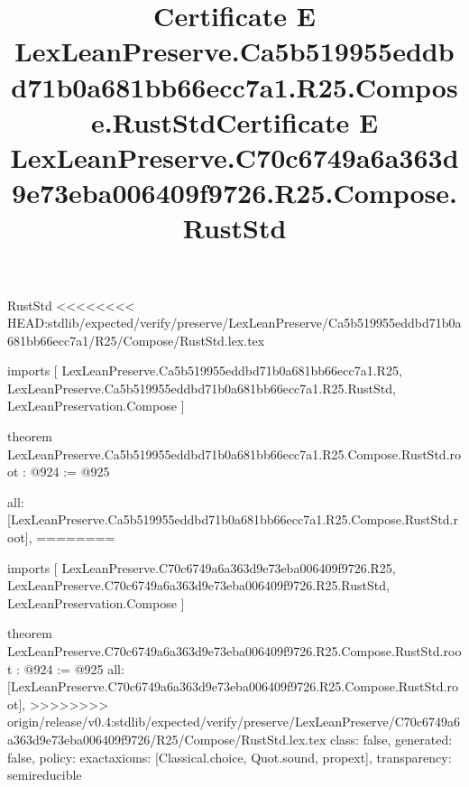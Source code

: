 \begin{lexlean}{RustStd}
<<<<<<<< HEAD:stdlib/expected/verify/preserve/LexLeanPreserve/Ca5b519955eddbd71b0a681bb66ecc7a1/R25/Compose/RustStd.lex.tex
\title{Certificate E LexLeanPreserve.Ca5b519955eddbd71b0a681bb66ecc7a1.R25.Compose.RustStd}
\begin{coremodule}
imports [
  LexLeanPreserve.Ca5b519955eddbd71b0a681bb66ecc7a1.R25,
  LexLeanPreserve.Ca5b519955eddbd71b0a681bb66ecc7a1.R25.RustStd,
  LexLeanPreservation.Compose
]

theorem LexLeanPreserve.Ca5b519955eddbd71b0a681bb66ecc7a1.R25.Compose.RustStd.root : @924 := @925 {
  all: [LexLeanPreserve.Ca5b519955eddbd71b0a681bb66ecc7a1.R25.Compose.RustStd.root],
========
\title{Certificate E LexLeanPreserve.C70c6749a6a363d9e73eba006409f9726.R25.Compose.RustStd}
\begin{coremodule}
imports [
  LexLeanPreserve.C70c6749a6a363d9e73eba006409f9726.R25,
  LexLeanPreserve.C70c6749a6a363d9e73eba006409f9726.R25.RustStd,
  LexLeanPreservation.Compose
]

theorem LexLeanPreserve.C70c6749a6a363d9e73eba006409f9726.R25.Compose.RustStd.root : @924 := @925 {
  all: [LexLeanPreserve.C70c6749a6a363d9e73eba006409f9726.R25.Compose.RustStd.root],
>>>>>>>> origin/release/v0.4:stdlib/expected/verify/preserve/LexLeanPreserve/C70c6749a6a363d9e73eba006409f9726/R25/Compose/RustStd.lex.tex
  class: false,
  generated: false,
  policy: exact{axioms: [Classical.choice, Quot.sound, propext]},
  transparency: semireducible
}


\end{coremodule}}
\end{coremodule}
\end{lexlean}

